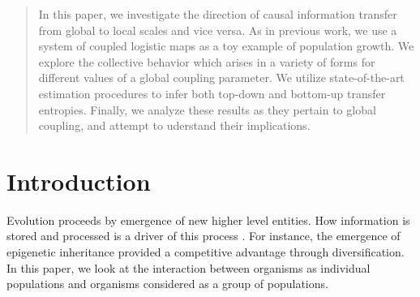 \documentclass[conference]{IEEEtran}
\begin{document}
\maketitle

\begin{abstract}
In this paper, we investigate the direction of causal information transfer from global to local scales and vice versa. As in previous work, we use a system of coupled logistic maps as a toy example of population growth. We explore the collective behavior which arises in a variety of forms for different values of a global coupling parameter. We utilize state-of-the-art estimation procedures to infer both top-down and bottom-up transfer entropies. Finally, we analyze these results as they pertain to global coupling, and attempt to uderstand their implications.
\end{abstract}





%
\IEEEpeerreviewmaketitle



\section{Introduction}
\noindent Evolution proceeds by emergence of new higher level entities.   How information is stored and processed is a driver of this process \cite{Walker}.   For instance, the emergence of epigenetic inheritance provided a competitive advantage through diversification.  
In this paper, we look at the interaction between organisms as individual  populations and organisms considered as a group of populations. \\ 
\end{document}
